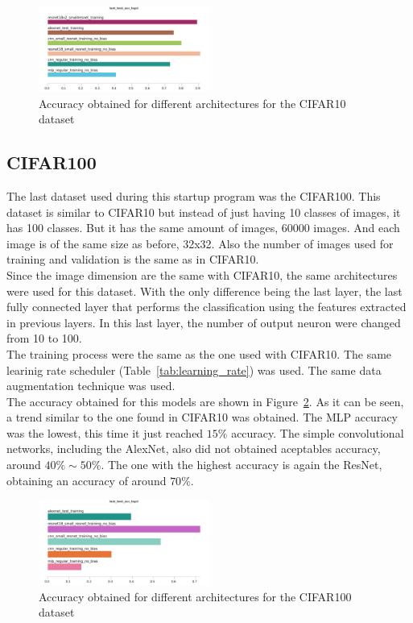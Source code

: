 \documentclass[english,preprint,JIP]{ipsj}
\begin{document}
\begin{figure}
    \centering
    \includegraphics[width=0.5\textwidth]{img/cifar10.png}
    \caption{Accuracy obtained for different architectures for the CIFAR10 dataset}
    \label{fig:cifar10_acc}
\end{figure}

\subsection{CIFAR100}
The last dataset used during this startup program was the CIFAR100. This dataset
is similar to CIFAR10 but instead of just having 10 classes of images, it has
100 classes. But it has the same amount of images, 60000 images. And each image
is of the same size as before, 32x32. Also the number of images used for
training and validation is the same as in CIFAR10.\\

Since the image dimension are the same with CIFAR10, the same architectures were
used for this dataset. With the only difference being the last layer, the last
fully connected layer that performs the classification using the features
extracted in previous layers. In this last layer, the number of output neuron
were changed from 10 to 100.\\

The training process were the same as the one used with CIFAR10. The same
learinig rate scheduler (Table~\ref{tab:learning_rate}) was used. The same data
augmentation technique was used.\\

The accuracy obtained for this models are shown in
Figure~\ref{fig:cifar100_acc}. As it can be seen, a trend similar to the one
found in CIFAR10 was obtained. The MLP accuracy was the lowest, this time it
just reached $15\%$ accuracy. The simple convolutional networks, including the
AlexNet, also did not obtained aceptables accuracy, around $40\% \sim 50\%$. The
one with the highest accuracy is again the ResNet, obtaining an accuracy of
around $70\%$.\\

\begin{figure}
    \includegraphics[width=0.5\textwidth]{img/cifar100.png}
    \caption{Accuracy obtained for different architectures for the CIFAR100 dataset}
    \label{fig:cifar100_acc}
\end{figure}
\end{document}
